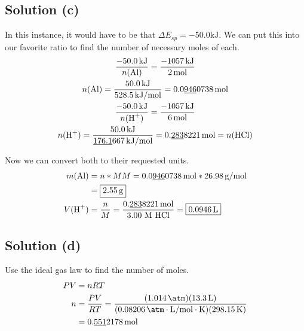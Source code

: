\documentclass[10pt]{article}
\newcommand{\U}[1]{\underline{#1}}
\begin{document}
        \subsection{Solution (c)}
            In this instance, it would have to be that $\Delta E_{sp} = -50.0\unit{\kilo\joule}$. 
            We can put this into our favorite ratio to find the number of necessary moles of each. 
            \begin{gather}
                \frac{-50.0\,\unit{\kilo\joule}}{n(\ce{Al})}    =   \frac{-1057\,\unit{\kilo\joule}}{2\,\unit{\mole}}\\
                n(\ce{Al})  =   \frac{50.0\,\unit{\kilo\joule}}{528.5\,\unit{\kilo\joule/\mole}}
                    =   0.0\U{946}0738\,\unit{\mole}\\
                \frac{-50.0\,\unit{\kilo\joule}}{n(\ce{H+})}    =   \frac{-1057\,\unit{\kilo\joule}}{6\,\unit{\mole}}\\
                n(\ce{H+})  =   \frac{50.0\,\unit{\kilo\joule}}{\U{176.1}667\,\unit{\kilo\joule/\mole}}
                    =   0.\U{283}8221\,\unit{\mole}
                    =   n(\ce{HCl})
            \end{gather}

            Now we can convert both to their requested units.
            \begin{align}
                m(\ce{Al})  &=  n * MM
                    =   0.0\U{946}0738\,\unit{\mole} * 26.98\,\unit{\gram/\mole}\\
                    &=  \boxed{2.55\,\unit{\gram}}\\
                V(\ce{H+})  &=  \frac{n}{M}
                    =   \frac{0.\U{283}8221\,\unit{\mole}}{3.00 \text{ M HCl}}
                    =   \boxed{0.0946\,\unit{\liter}}
            \end{align}

        \subsection{Solution (d)}
            Use the ideal gas law to find the number of moles.
            \begin{align}
                PV  &=  nRT\\
                n   &=  \frac{PV}{RT}
                    =   \frac{(1.014\,\unit{\atm})(13.3\,\unit{\liter})}{(0.08206\,\unit{\atm\cdot\liter/\mole\cdot\kelvin})(298.15\,\unit{\kelvin})}\\
                    &=  0.\U{551}2178\,\unit{\mole}
            \end{align}
\end{document}
